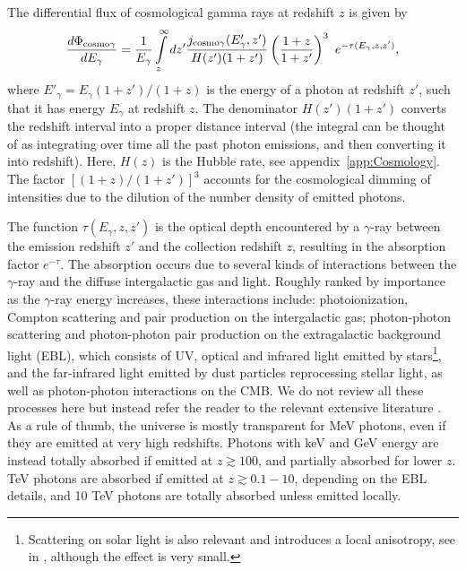 The differential flux of cosmological gamma rays at redshift $z$ is given by 
\begin{equation}
\label{eq:EGflux}
\frac{d\Phi_{{\rm cosmo}\gamma}}{dE_\gamma}
=  \frac{1}{E_\gamma}  \int\limits_z^{\infty}dz' \frac{j_{{\rm cosmo}\gamma}(E'_\gamma ,z')}{H(z')(1+z')}\left(\frac{1+z}{1+z'}\right)^3
\ e^{-\tau(E_\gamma,z,z')},
\end{equation}
where $E'_\gamma =E_\gamma  (1+z')/(1+z)$ is the energy of a photon at redshift $z'$, such that it has energy $E_\gamma$ at redshift $z$.
The denominator $H(z')(1+z')$  converts the redshift interval into a proper distance interval (the integral can be thought of as integrating over time all the past photon emissions, and then converting it into redshift). 
Here, $H(z)$ is the Hubble rate, see appendix~\ref{app:Cosmology}.
The factor $[(1+z)/(1+z')]^3$ accounts for the cosmological dimming of intensities due to the dilution of the number density of emitted photons.

The function $\tau(E_\gamma,z,z')$ is the optical depth encountered by a $\gamma$-ray between the emission redshift $z'$ and the collection redshift $z$, resulting in the absorption factor $e^{- \tau}$. The absorption occurs due to several kinds of interactions between the $\gamma$-ray and the diffuse intergalactic gas and light. 
Roughly ranked by importance as the $\gamma$-ray energy increases, these interactions include: 
photoionization, Compton scattering and pair production on the intergalactic gas; photon-photon scattering and photon-photon pair production on the extragalactic background light (EBL), which consists of UV, optical and infrared light emitted by stars\footnote{Scattering on solar light is also relevant and introduces a local anisotropy, see  in \cite{gammarayabsorption}, although the effect is very small.},  and the far-infrared light emitted by dust particles reprocessing stellar light, as well as photon-photon interactions on the CMB.
We do not review all these processes here but 
instead refer the reader to the relevant extensive literature \cite{gammarayabsorption,PPPC4DMID}. As a rule of thumb, the universe is mostly transparent for MeV photons, even if they are emitted at very high redshifts. Photons with keV and GeV energy are instead totally absorbed if emitted at $z\gtrsim 100$, and partially absorbed for lower $z$. TeV photons are absorbed if emitted at $z\gtrsim 0.1 - 10$, depending on the EBL details, and 10 TeV photons are totally absorbed unless emitted locally.

